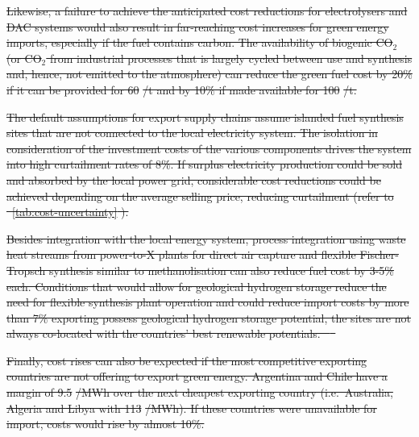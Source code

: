 \documentclass[5p,9pt,draft]{elsarticle}
\providecommand{\DIFdeltex}[1]{{\protect\color{red}\sout{#1}}}                      %
\providecommand{\DIFdel}[1]{\texorpdfstring{\DIFdeltex{#1}}{}} %
\begin{document}
\DIFdel{Likewise, a failure to achieve the anticipated cost reductions for electrolysers
and DAC systems would also result in far-reaching cost increases for green
energy imports, especially if the fuel contains carbon. The availability of
biogenic CO$_2$ (or CO$_2$ from industrial processes that is largely cycled
between use and synthesis and, hence, not emitted to the atmosphere) can reduce
the green fuel cost by 20\% if it can be provided for 60 }%
\DIFdel{/t and by 10\%
if made available for 100 }%
\DIFdel{/t.
}%

\DIFdel{The default assumptions for export supply chains assume islanded fuel synthesis
sites that are not connected to the local electricity system. The isolation in
consideration of the investment costs of the various components drives the
system into high curtailment rates of 8\%. If surplus electricity production
could be sold and absorbed by the local power grid, considerable cost reductions
could be achieved depending on the average selling price, reducing curtailment
(refer to \mbox{%
\cref{tab:cost-uncertainty}}\hskip0pt%
).
}%

\DIFdel{Besides integration with the local energy system, process integration using
waste heat streams from power-to-X plants for direct air capture and flexible
Fischer-Tropsch synthesis similar to methanolisation can also reduce fuel cost
by 3-5\% each. Conditions that would allow for geological hydrogen storage
reduce the need for flexible synthesis plant operation and could reduce import
costs by more than 7\% %
exporting possess geological hydrogen storage potential, the sites are not
always co-located with the countries' best renewable potentials.
\mbox{%
\cite{hevinUndergroundStorage2019}
}\hskip0pt%
}%

\DIFdel{Finally, cost rises can also be expected if the most competitive exporting
countries are not offering to export green energy. Argentina and Chile have a
margin of 9.5 }%
\DIFdel{/MWh over the next cheapest exporting country
(i.e.~Australia, Algeria and Libya with 113 }%
\DIFdel{/MWh). If these countries
were unavailable for import, costs would rise by almost 10\%.
}%
\end{document}

